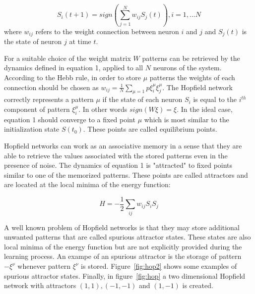 \documentclass[conference,compsoc]{IEEEtran}
\begin{document}
\begin{equation}
S_i(t+1) = sign(\sum_{j=1}^{N} w_{ij}S_j(t)), i = 1,...N
\end{equation}
where $w_{ij}$ refers to the weight connection between neuron $i$ and $j$ and $S_j(t)$ is the state of neuron $j$ at time $t$. 

For a suitable choice of the weight matrix $W$ patterns can be retrieved by the dynamics defined in equation 1, applied to all $N$ neurons of the system. According to the Hebb rule, in order to store $\mu$ patterns the weights of each connection should be chosen as $w_{ij} = \frac{1}{N} \sum_{\mu=1}{p}\xi_i^\mu\xi_j^\mu$. The Hopfield network correctly represents a pattern $\mu$ if the state of each neuron $S_i$ is equal to the $i^{th}$ component of pattern $\xi_i^{\mu}$. In other words $sign(W\xi)=\xi$. In the ideal case, equation 1 should converge to a fixed point $\mu$ which is most similar to the initialization state $S(t_0)$. These points are called equilibrium points.

Hopfield networks can work as an associative memory in a sense that they are able to retrieve the values associated with the stored patterns even in the presence of noise. 
The dynamics of equation 1 is "attracted" to fixed points similar to one of the memorized patterns. These points are called attractors and are located at the local minima of the energy function:

\begin{equation}
H = -\frac{1}{2}\sum_{ij}w_{ij} S_iS_j
\end{equation}

A well known problem of Hopfield networks is that they may store additional unwanted patterns that are called spurious attractor states. These states are also local minima of the energy function but are not explicitly provided during the learning process. An exampe of an spurious attractor is the storage of pattern $-\xi^\nu$ whenever pattern $\xi^\nu$ is stored. Figure~\ref{fig:hop2} shows some examples of spurious attractor states. Finally, in figure~\ref{fig:hop} a two dimensional Hopfield network with attractors $(1,1), (-1,-1)$ and $(1,-1)$ is created. 
\end{document}
